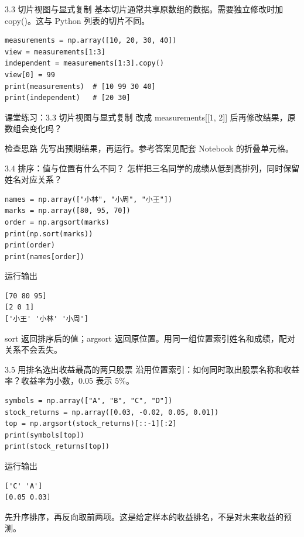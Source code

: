 \documentclass[9pt]{ctexbeamer}
\begin{document}
\begin{frame}[fragile]{3.3 切片视图与显式复制}
\small 基本切片通常共享原数组的数据。需要独立修改时加 copy()。这与 Python 列表的切片不同。
\medskip
\begin{lstlisting}
measurements = np.array([10, 20, 30, 40])
view = measurements[1:3]
independent = measurements[1:3].copy()
view[0] = 99
print(measurements)  # [10 99 30 40]
print(independent)   # [20 30]
\end{lstlisting}
\end{frame}
\begin{frame}[fragile]{课堂练习：3.3 切片视图与显式复制}
改成 measurements[[1, 2]] 后再修改结果，原数组会变化吗？
\medskip
\begin{block}{检查思路}
先写出预期结果，再运行。参考答案见配套 Notebook 的折叠单元格。
\end{block}
\end{frame}

\begin{frame}[fragile]{3.4 排序：值与位置有什么不同？}
\small 怎样把三名同学的成绩从低到高排列，同时保留姓名对应关系？
\medskip
\begin{lstlisting}
names = np.array(["小林", "小周", "小王"])
marks = np.array([80, 95, 70])
order = np.argsort(marks)
print(np.sort(marks))
print(order)
print(names[order])
\end{lstlisting}
\begin{exampleblock}{运行输出}
\begin{lstlisting}
[70 80 95]
[2 0 1]
['小王' '小林' '小周']
\end{lstlisting}
\end{exampleblock}
\small sort 返回排序后的值；argsort 返回原位置。用同一组位置索引姓名和成绩，配对关系不会丢失。
\end{frame}

\begin{frame}[fragile]{3.5 用排名选出收益最高的两只股票}
\small 沿用位置索引：如何同时取出股票名称和收益率？收益率为小数，0.05 表示 5\%。
\medskip
\begin{lstlisting}
symbols = np.array(["A", "B", "C", "D"])
stock_returns = np.array([0.03, -0.02, 0.05, 0.01])
top = np.argsort(stock_returns)[::-1][:2]
print(symbols[top])
print(stock_returns[top])
\end{lstlisting}
\begin{exampleblock}{运行输出}
\begin{lstlisting}
['C' 'A']
[0.05 0.03]
\end{lstlisting}
\end{exampleblock}
\small 先升序排序，再反向取前两项。这是给定样本的收益排名，不是对未来收益的预测。
\end{frame}
\end{document}
